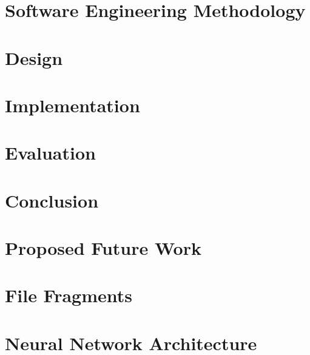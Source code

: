 \documentclass[
11pt, %
oneside, %
english, %
singlespacing, %
liststotoc, %
toctotoc, %
parskip, %
headsepline, %
]{MastersDoctoralThesis} %
\newcommand{\chapterinput}[1]{}
\newcommand{\appendixinput}[1]{}
\begin{document}
\chapter{Software Engineering Methodology}
\chapterinput{software_engineering.tex}

\chapter{Design}
\chapterinput{design.tex}


\chapter{Implementation}
\chapterinput{implementation.tex}

\chapter{Evaluation}
\chapterinput{evaluation.tex}


\chapter{Conclusion}
\chapterinput{conclusion.tex}

\chapter{Proposed Future Work}
\chapterinput{future.tex}


\appendix

\chapter{File Fragments}
\appendixinput{code.tex}

\chapter{Neural Network Architecture}
\appendixinput{nnArchitectures.tex}
\end{document}
